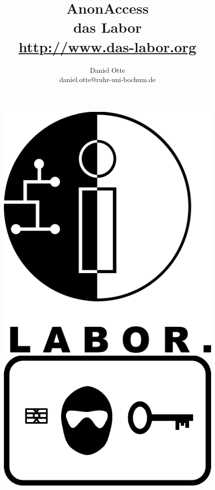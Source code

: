 \documentclass[10pt,a4paper]{article}
\author{Daniel Otte\\daniel.otte@ruhr-uni-bochum.de}
\title{\huge{AnonAccess} \\ \normalsize{das Labor \\ \url{http://www.das-labor.org}}}
\begin{document}
 

\begin{figure}[t]
 \begin{minipage}[b]{.3\linewidth}
 \includegraphics[scale=0.1]{Labor} 
 \end{minipage}
 \hspace{0.5\linewidth}
 \begin{minipage}[b]{.3\linewidth}
 \includegraphics[scale=0.7]{AnonAccessLogo} 
 \end{minipage}
\end{figure}
\end{document}
